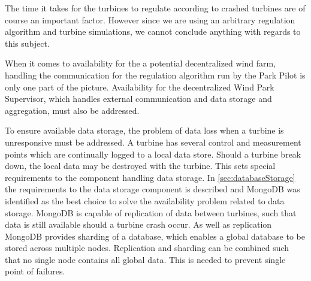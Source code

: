 %
%

The time it takes for the turbines to regulate according to crashed turbines are of course an important factor.
However since we are using an arbitrary regulation algorithm and turbine simulations, we cannot conclude anything with regards to this subject.


When it comes to availability for the a potential decentralized wind farm, handling the communication for the regulation algorithm run by the Park Pilot is only one part of the picture. Availability for the decentralized Wind Park Supervisor, which handles external communication and data storage and aggregation, must also be addressed. 

To ensure available data storage, the problem of data loss when a turbine is unresponsive must be addressed. A turbine has several control and measurement points which are continually logged to a local data store. Should a turbine break down, the local data may be destroyed with the turbine. This sets special requirements to the component handling data storage. In \cref{sec:databaseStorage} the requirements to the data storage component is described and MongoDB was identified as the best choice to solve the availability problem related to data storage. MongoDB is capable of replication of data between turbines, such that data is still available should a turbine crash occur. As well as replication MongoDB provides sharding of a database, which enables a global database to be stored across multiple nodes. Replication and sharding can be combined such that no single node contains all global data. This is needed to prevent single point of failures. 

